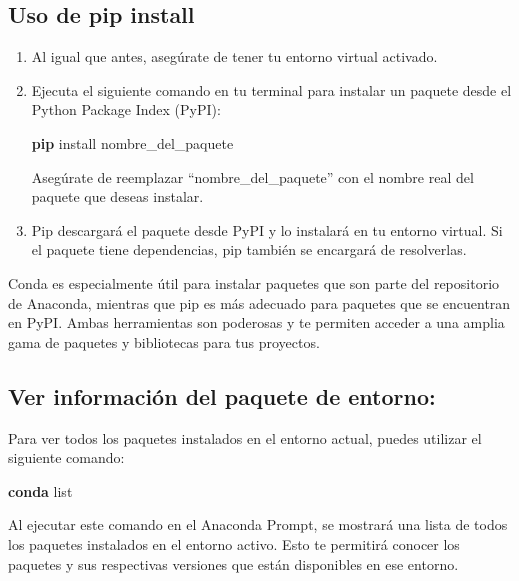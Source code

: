 \documentclass[
  letterpaper,
  DIV=11,
  numbers=noendperiod]{scrartcl}
\newenvironment{Shaded}{}{}
\newcommand{\ExtensionTok}[1]{\textcolor[rgb]{0.84,0.23,0.29}{\textbf{#1}}}
\newcommand{\NormalTok}[1]{\textcolor[rgb]{0.14,0.16,0.18}{#1}}
\begin{document}
\hypertarget{uso-de-pip-install}{%
\subsection{Uso de pip install}\label{uso-de-pip-install}}

\begin{enumerate}
\def\labelenumi{\arabic{enumi}.}
\item
  Al igual que antes, asegúrate de tener tu entorno virtual activado.
\item
  Ejecuta el siguiente comando en tu terminal para instalar un paquete
  desde el Python Package Index (PyPI):

\begin{Shaded}
\begin{Highlighting}[]
\ExtensionTok{pip}\NormalTok{ install nombre\_del\_paquete}
\end{Highlighting}
\end{Shaded}

  Asegúrate de reemplazar ``nombre\_del\_paquete'' con el nombre real
  del paquete que deseas instalar.
\item
  Pip descargará el paquete desde PyPI y lo instalará en tu entorno
  virtual. Si el paquete tiene dependencias, pip también se encargará de
  resolverlas.
\end{enumerate}

Conda es especialmente útil para instalar paquetes que son parte del
repositorio de Anaconda, mientras que pip es más adecuado para paquetes
que se encuentran en PyPI. Ambas herramientas son poderosas y te
permiten acceder a una amplia gama de paquetes y bibliotecas para tus
proyectos.

\hypertarget{ver-informaciuxf3n-del-paquete-de-entorno}{%
\subsection{Ver información del paquete de
entorno:}\label{ver-informaciuxf3n-del-paquete-de-entorno}}

Para ver todos los paquetes instalados en el entorno actual, puedes
utilizar el siguiente comando:

\begin{Shaded}
\begin{Highlighting}[]
\ExtensionTok{conda}\NormalTok{ list}
\end{Highlighting}
\end{Shaded}

Al ejecutar este comando en el Anaconda Prompt, se mostrará una lista de
todos los paquetes instalados en el entorno activo. Esto te permitirá
conocer los paquetes y sus respectivas versiones que están disponibles
en ese entorno.
\end{document}
